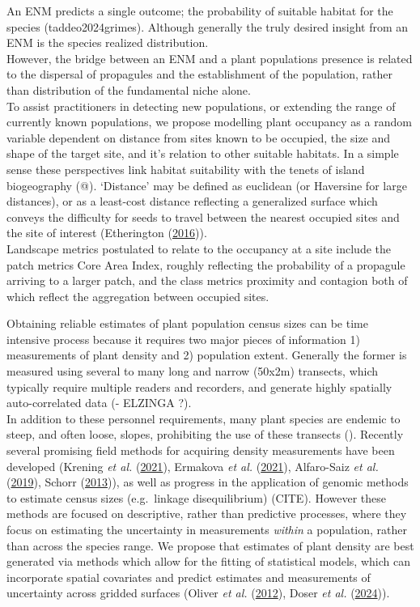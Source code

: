 \documentclass[
]{article}
\begin{document}
An ENM predicts a single outcome; the probability of suitable habitat
for the species (taddeo2024grimes). Although generally the truly desired
insight from an ENM is the species realized distribution.\\
However, the bridge between an ENM and a plant populations presence is
related to the dispersal of propagules and the establishment of the
population, rather than distribution of the fundamental niche alone.\\
To assist practitioners in detecting new populations, or extending the
range of currently known populations, we propose modelling plant
occupancy as a random variable dependent on distance from sites known to
be occupied, the size and shape of the target site, and it's relation to
other suitable habitats. In a simple sense these perspectives link
habitat suitability with the tenets of island biogeography (@).
`Distance' may be defined as euclidean (or Haversine for large
distances), or as a least-cost distance reflecting a generalized surface
which conveys the difficulty for seeds to travel between the nearest
occupied sites and the site of interest (Etherington
(\protect\hyperlink{ref-etherington2016least}{2016})).\\
Landscape metrics postulated to relate to the occupancy at a site
include the patch metrics Core Area Index, roughly reflecting the
probability of a propagule arriving to a larger patch, and the class
metrics proximity and contagion both of which reflect the aggregation
between occupied sites.

Obtaining reliable estimates of plant population census sizes can be
time intensive process because it requires two major pieces of
information 1) measurements of plant density and 2) population extent.
Generally the former is measured using several to many long and narrow
(50x2m) transects, which typically require multiple readers and
recorders, and generate highly spatially auto-correlated data (- ELZINGA
?).\\
In addition to these personnel requirements, many plant species are
endemic to steep, and often loose, slopes, prohibiting the use of these
transects (). Recently several promising field methods for acquiring
density measurements have been developed (Krening \emph{et al.}
(\protect\hyperlink{ref-krening2021sampling}{2021}), Ermakova \emph{et
al.} (\protect\hyperlink{ref-ermakova2021densities}{2021}), Alfaro-Saiz
\emph{et al.} (\protect\hyperlink{ref-alfaro2019optimal}{2019}), Schorr
(\protect\hyperlink{ref-schorr2013using}{2013})), as well as progress in
the application of genomic methods to estimate census sizes
(e.g.~linkage disequilibrium) (CITE). However these methods are focused
on descriptive, rather than predictive processes, where they focus on
estimating the uncertainty in measurements \emph{within} a population,
rather than across the species range. We propose that estimates of plant
density are best generated via methods which allow for the fitting of
statistical models, which can incorporate spatial covariates and predict
estimates and measurements of uncertainty across gridded surfaces
(Oliver \emph{et al.}
(\protect\hyperlink{ref-oliver2012population}{2012}), Doser \emph{et
al.} (\protect\hyperlink{ref-doser2022spabundance}{2024})).
\end{document}

